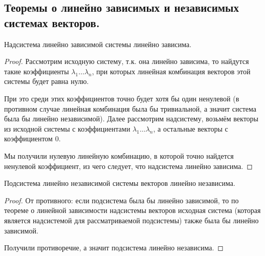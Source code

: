 \subsection{%
  Теоремы о линейно зависимых и независимых системах векторов.%
}

\begin{theorem}
  Надсистема линейно зависимой системы линейно зависима.
\end{theorem}

\begin{proof}
  Рассмотрим исходную систему, т.к. она линейно зависима, то найдутся такие
  коэффициенты \(\lambda_1 \dotsc \lambda_n\), при которых линейная комбинация
  векторов этой системы будет равна нулю.
  
  При это среди этих коэффициентов точно будет хотя бы один ненулевой (в
  противном случае линейная комбинация была бы тривиальной, а значит система
  была бы линейно независимой). Далее рассмотрим надсистему, возьмём векторы из
  исходной системы с коэффициентами \(\lambda_1 \dotsc \lambda_n\), а остальные
  векторы с коэффициентом \(0\).
  
  Мы получили нулевую линейную комбинацию, в которой точно найдется ненулевой
  коэффициент, из чего следует, что надсистема линейно зависима.
\end{proof}

\begin{theorem}
  Подсистема линейно независимой системы векторов линейно независима.
\end{theorem}

\begin{proof}
  От противного: если подсистема была бы линейно зависимой, то по теореме о
  линейной зависимости надсистемы векторов исходная система (которая является
  надсистемой для рассматриваемой подсистемы) также была бы линейно зависимой.
  
  Получили противоречие, а значит подсистема линейно независима.
\end{proof}

